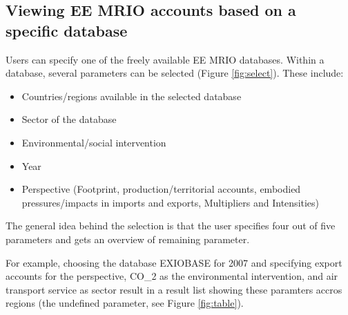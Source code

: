 \subsection{Viewing EE MRIO accounts based on a specific database}

Users can specify one of the freely available EE MRIO databases. 
Within a database, several parameters can be selected (Figure \ref{fig:select}). These include:

\begin{itemize}
    \item Countries/regions available in the selected database
    \item Sector of the database
    \item Environmental/social intervention
    \item Year
    \item Perspective (Footprint, production/territorial accounts, embodied
      pressures/impacts in imports and exports, Multipliers and Intensities)
\end{itemize}


The general idea behind the selection is that the user specifies four out
of five parameters and gets an overview of remaining parameter.

For example, choosing the database EXIOBASE for 2007 and specifying export accounts for the perspective, CO_2 as the environmental intervention, and air transport service as sector result in a result list showing these paramters accros regions (the undefined parameter, see Figure \ref{fig:table}).